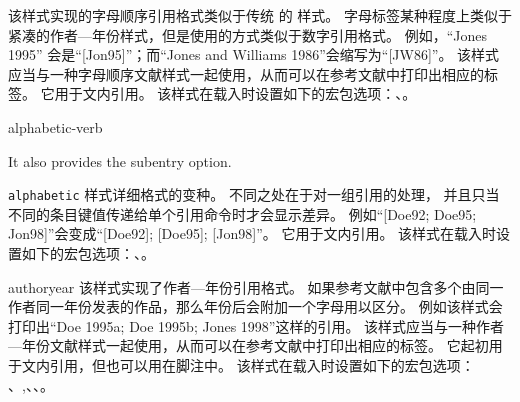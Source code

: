 \begin{marglist}
该样式实现的字母顺序引用格式类似于传统 \BibTeX 的  样式。
字母标签某种程度上类似于紧凑的作者---年份样式，但是使用的方式类似于数字引用格式。
例如，“Jones 1995” 会是“[Jon95]”；而“Jones and Williams 1986”会缩写为“[JW86]”。
该样式应当与一种字母顺序文献样式一起使用，从而可以在参考文献中打印出相应的标签。
它用于文内引用。
该样式在载入时设置如下的宏包选项：、。

\item[alphabetic-verb]

 It also provides the subentry option.

\texttt{alphabetic} 样式详细格式的变种。
不同之处在于对一组引用的处理，
并且只当不同的条目键值传递给单个引用命令时才会显示差异。
例如“[Doe92; Doe95; Jon98]”会变成“[Doe92]; [Doe95]; [Jon98]”。
它用于文内引用。
该样式在载入时设置如下的宏包选项：、。

\item[authoryear]
该样式实现了作者---年份引用格式。
如果参考文献中包含多个由同一作者同一年份发表的作品，那么年份后会附加一个字母用以区分。
例如该样式会打印出“Doe 1995a; Doe 1995b; Jones 1998”这样的引用。
该样式应当与一种作者---年份文献样式一起使用，从而可以在参考文献中打印出相应的标签。
它起初用于文内引用，但也可以用在脚注中。
该样式在载入时设置如下的宏包选项：
、,、、。


\end{marglist}
